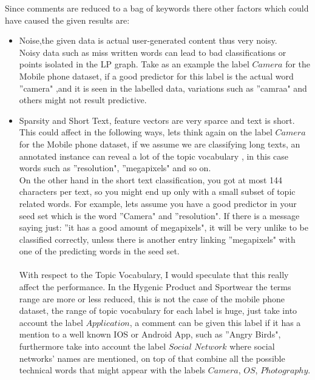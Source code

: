 \documentclass[4pt,a4paper,twocolumn]{article}
\begin{document}
Since comments are reduced to a bag of keywords there other factors which could have caused the given results  are:
\begin{itemize}
\item Noise,the given data is actual user-generated content thus very noisy.\\
Noisy data such as miss written words can lead to bad classifications or points isolated in the LP graph. Take as an example the label $Camera$ for the Mobile phone dataset, if a good predictor for this label is the actual word ''camera" ,and it is seen in the labelled data, variations such as ''camraa" and others might not result predictive.

\item Sparsity and Short Text, feature vectors are very sparce and text is short. This could affect in the following ways, lets think again on the label $Camera$ for the Mobile  phone dataset, if we assume we are classifying long texts, an annotated instance can reveal a lot of the topic vocabulary , in this case words such as ''resolution", ''megapixels" and so on.\\
On the other hand in the short text classification, you got at most 144 characters per text, so you might end up only with a small subset of topic related words. For example, lets assume you have a good predictor in your seed set which is the word ''Camera" and ''resolution". If there is a message saying just: ''it has a good amount of megapixels", it will be very unlike to be classified correctly, unless there is another entry linking ''megapixels" with one of the predicting words in the seed set.\\
\\
With respect to the Topic Vocabulary, I would speculate that this really affect the performance. In the Hygenic Product and  Sportwear the terms range are more or less reduced, this is not the case of the mobile phone dataset, the range of topic vocabulary for each label is huge, just take into account the label $Application$, a comment can be given this label if it has a mention to a well known IOS or Android App, such as ''Angry Birds", furthermore take into account the label $Social$ $Network$ where social networks' names are mentioned, on top of that combine all the possible technical words that might appear with the labels $Camera$, $OS$, $Photography$.

\end{itemize} 
\end{document}
